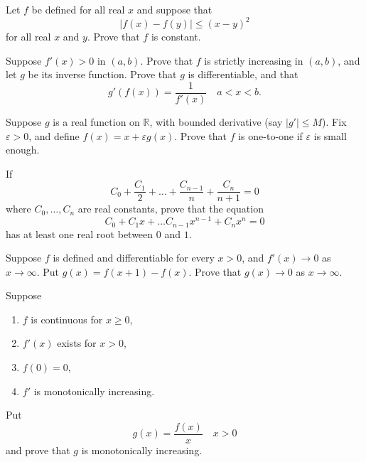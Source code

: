 \documentclass[12 pt, letterpaper]{hmcpset}
\begin{document}
\begin{problem}
	Let $f$ be defined for all real $x$ and suppose that
	\[
		\lvert f(x) - f(y) \rvert \le (x - y)^{2}
	\]
	for all real $x$ and $y$. Prove that $f$ is constant.
\end{problem}

\pagebreak

\begin{problem}
	Suppose $f'(x) > 0$ in $(a, b)$. Prove that $f$ is strictly increasing in $(a, b)$, and let $g$ be its inverse function. Prove that $g$ is differentiable, and that
	\[
		g'(f(x)) = \frac{1}{f'(x)} \quad a < x < b.
	\]
\end{problem}

\pagebreak

\begin{problem}
	Suppose $g$ is a real function on $\mathbb{R}$, with bounded derivative (say $\lvert g' \rvert \le M$). Fix $\varepsilon > 0$, and define $f(x) = x + \varepsilon g(x)$. Prove that $f$ is one-to-one if $\varepsilon$ is small enough.
\end{problem}

\pagebreak

\begin{problem}
	If
	\[
		C_{0} + \frac{C_{1}}{2} + \dots + \frac{C_{n - 1}}{n} + \frac{C_{n}}{n + 1} = 0
	\]
	where $C_{0}, \dots, C_{n}$ are real constants, prove that the equation
	\[
		C_{0} + C_{1} x + \dots C_{n - 1} x^{n - 1} + C_{n} x^{n} = 0
	\]
	has at least one real root between $0$ and $1$.
\end{problem}

\pagebreak

\begin{problem}
	Suppose $f$ is defined and differentiable for every $x > 0$, and $f'(x) \to 0$ as $x \to \infty$. Put $g(x) = f(x + 1) - f(x)$. Prove that $g(x) \to 0$ as $x \to \infty$.
\end{problem}

\pagebreak


\begin{problem}
	Suppose
	\begin{enumerate}
		\item $f$ is continuous for $x \ge 0$,
		\item $f'(x)$ exists for $x > 0$,
		\item $f(0) = 0$,
		\item $f'$ is monotonically increasing.
	\end{enumerate}
	Put
	\[
		g(x) = \frac{f(x)}{x} \quad x > 0
	\]
	and prove that $g$ is monotonically increasing.
\end{problem}
\end{document}
